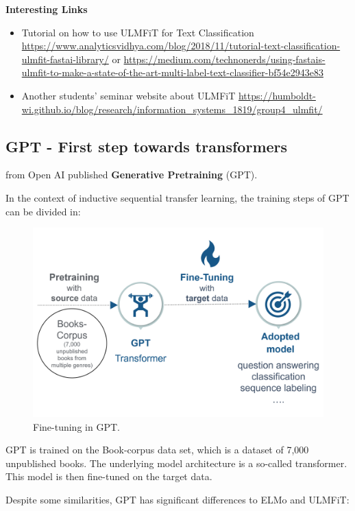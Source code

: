 \documentclass[]{krantz}
\begin{document}
\textbf{Interesting Links}

\begin{itemize}
\item
  Tutorial on how to use ULMFiT for Text Classification \url{https://www.analyticsvidhya.com/blog/2018/11/tutorial-text-classification-ulmfit-fastai-library/} or \url{https://medium.com/technonerds/using-fastais-ulmfit-to-make-a-state-of-the-art-multi-label-text-classifier-bf54e2943e83}
\item
  Another students' seminar website about ULMFiT \url{https://humboldt-wi.github.io/blog/research/information_systems_1819/group4_ulmfit/}
\end{itemize}

\hypertarget{gpt---first-step-towards-transformers}{%
\subsection{GPT - First step towards transformers}\label{gpt---first-step-towards-transformers}}

\citet{radford2018} from Open AI published \textbf{Generative Pretraining} (GPT).

In the context of inductive sequential transfer learning, the training steps of GPT can be divided in:

\begin{figure}

{\centering \includegraphics[width=0.6\linewidth]{figures/02-01-transfer-learning-for-nlp-1/sequential-transfer-learning-gpt} 

}

\caption{Fine-tuning in GPT.}\label{fig:ch21-tl-gpt}
\end{figure}

GPT is trained on the Book-corpus data set, which is a dataset of 7,000 unpublished books. The underlying model architecture is a so-called transformer. This model is then fine-tuned on the target data.

Despite some similarities, GPT has significant differences to ELMo and ULMFiT:
\end{document}
